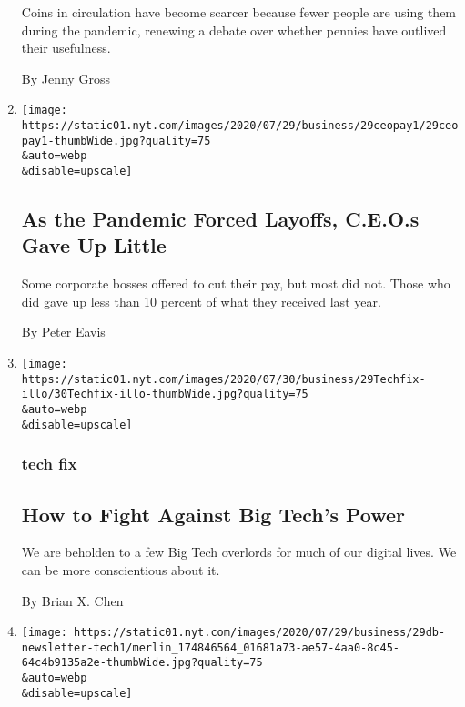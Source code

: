 \begin{enumerate}
  Coins in circulation have become scarcer because fewer people are
  using them during the pandemic, renewing a debate over whether pennies
  have outlived their usefulness.

  By Jenny Gross
\item
  \href{/2020/07/29/business/economy/ceo-pay-pandemic-layoffs.html}{}

  \texttt{[image: https://static01.nyt.com/images/2020/07/29/business/29ceopay1/29ceopay1-thumbWide.jpg?quality=75\\\&auto=webp\\\&disable=upscale]}

  \hypertarget{as-the-pandemic-forced-layoffs-ceos-gave-up-little}{%
  \subsection{As the Pandemic Forced Layoffs, C.E.O.s Gave Up
  Little}\label{as-the-pandemic-forced-layoffs-ceos-gave-up-little}}

  Some corporate bosses offered to cut their pay, but most did not.
  Those who did gave up less than 10 percent of what they received last
  year.

  By Peter Eavis
\item
  \href{/2020/07/29/technology/personaltech/big-tech-power-how-to-fight.html}{}

  \texttt{[image: https://static01.nyt.com/images/2020/07/30/business/29Techfix-illo/30Techfix-illo-thumbWide.jpg?quality=75\\\&auto=webp\\\&disable=upscale]}

  \hypertarget{tech-fix}{%
  \subsubsection{tech fix}\label{tech-fix}}

  \hypertarget{how-to-fight-against-big-techs-power}{%
  \subsection{How to Fight Against Big Tech's
  Power}\label{how-to-fight-against-big-techs-power}}

  We are beholden to a few Big Tech overlords for much of our digital
  lives. We can be more conscientious about it.

  By Brian X. Chen
\item
  \href{/2020/07/29/business/dealbook/tech-congress-hearing-questions.html}{}

  \texttt{[image: https://static01.nyt.com/images/2020/07/29/business/29db-newsletter-tech1/merlin\_174846564\_01681a73-ae57-4aa0-8c45-64c4b9135a2e-thumbWide.jpg?quality=75\\\&auto=webp\\\&disable=upscale]}


\end{enumerate}
